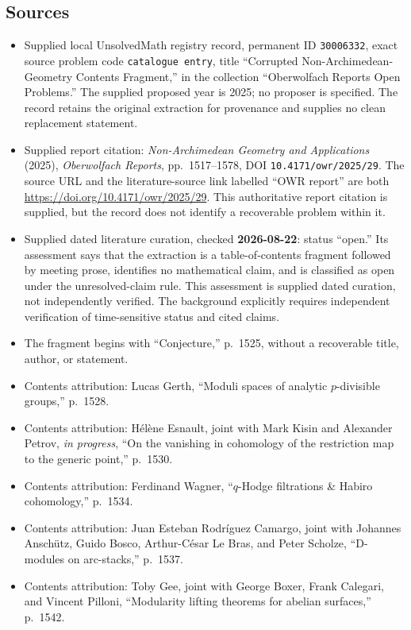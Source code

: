\documentclass[11pt]{article}
\begin{document}
\subsection{Sources}
\begin{itemize}
\item Supplied local UnsolvedMath registry record, permanent ID \texttt{30006332}, exact source problem code \texttt{catalogue entry}, title ``Corrupted Non-Archimedean-Geometry Contents Fragment,'' in the collection ``Oberwolfach Reports Open Problems.'' The supplied proposed year is 2025; no proposer is specified. The record retains the original extraction for provenance and supplies no clean replacement statement.
\item Supplied report citation: \emph{Non-Archimedean Geometry and Applications} (2025), \emph{Oberwolfach Reports}, pp.~1517--1578, DOI \texttt{10.4171/owr/2025/29}. The source URL and the literature-source link labelled ``OWR report'' are both \url{https://doi.org/10.4171/owr/2025/29}. This authoritative report citation is supplied, but the record does not identify a recoverable problem within it.
\item Supplied dated literature curation, checked \textbf{2026-08-22}: status ``open.'' Its assessment says that the extraction is a table-of-contents fragment followed by meeting prose, identifies no mathematical claim, and is classified as open under the unresolved-claim rule. This assessment is supplied dated curation, not independently verified. The background explicitly requires independent verification of time-sensitive status and cited claims.
\item The fragment begins with ``Conjecture,'' p.~1525, without a recoverable title, author, or statement.
\item Contents attribution: Lucas Gerth, ``Moduli spaces of analytic $p$-divisible groups,'' p.~1528.
\item Contents attribution: Hélène Esnault, joint with Mark Kisin and Alexander Petrov, \emph{in progress}, ``On the vanishing in cohomology of the restriction map to the generic point,'' p.~1530.
\item Contents attribution: Ferdinand Wagner, ``$q$-Hodge filtrations \& Habiro cohomology,'' p.~1534.
\item Contents attribution: Juan Esteban Rodríguez Camargo, joint with Johannes Anschütz, Guido Bosco, Arthur-César Le Bras, and Peter Scholze, ``D-modules on arc-stacks,'' p.~1537.
\item Contents attribution: Toby Gee, joint with George Boxer, Frank Calegari, and Vincent Pilloni, ``Modularity lifting theorems for abelian surfaces,'' p.~1542.

\end{itemize}
\end{document}

